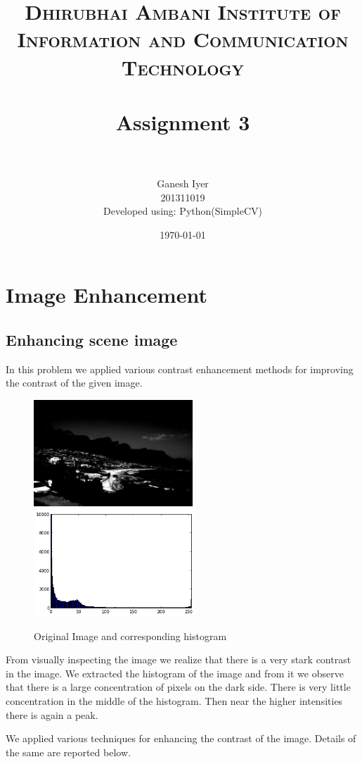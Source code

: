 \documentclass[paper=a4, fontsize=11pt]{scrartcl} %
\title{	
\normalfont \normalsize 
\textsc{Dhirubhai Ambani Institute of Information and Communication Technology} \\ [25pt] %
\horrule{0.5pt} \\[0.4cm] %
\huge Assignment 3 \\ %
\horrule{2pt} \\[0.5cm] %
}
\author{Ganesh Iyer \\ 201311019 \\Developed using: Python(SimpleCV)}
\date{\normalsize\today} %
\numberwithin{equation}{section} %
\numberwithin{figure}{section} %
\numberwithin{table}{section} %
\begin{document}
\maketitle %


\section{Image Enhancement}
    \subsection{Enhancing scene image}
    In this problem we applied various contrast enhancement methods for improving the contrast of the given image.
        \begin{figure}[h!]
            \centering
            \includegraphics[clip,height=4cm]{scene}
            \includegraphics[clip,height=4cm]{scenehist}
            \caption{Original Image and corresponding histogram}
        \end{figure}

    From visually inspecting the image we realize that there is a very stark contrast in the image. We extracted the histogram of the image and from it we observe that there is a large concentration of pixels on the dark side. There is very little concentration in the middle of the histogram. Then near the higher intensities there is again a peak.

    We applied various techniques for enhancing the contrast of the image. Details of the same are reported below.
\end{document}
